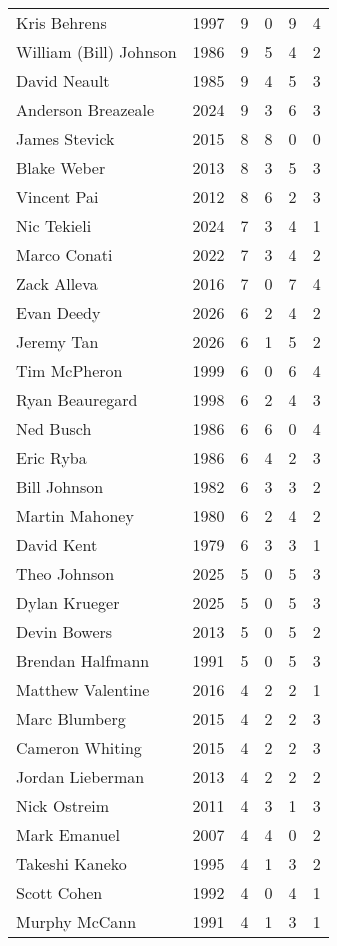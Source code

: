 \begin{longtable}{lccccc}
    Kris Behrens & 1997 & 9 & 0 & 9 & 4 \\
    William (Bill) Johnson & 1986 & 9 & 5 & 4 & 2 \\
    David Neault & 1985 & 9 & 4 & 5 & 3 \\
    Anderson Breazeale & 2024 & 9 & 3 & 6 & 3 \\
    James Stevick & 2015 & 8 & 8 & 0 & 0 \\
    Blake Weber & 2013 & 8 & 3 & 5 & 3 \\
    Vincent Pai & 2012 & 8 & 6 & 2 & 3 \\
    Nic Tekieli & 2024 & 7 & 3 & 4 & 1 \\
    Marco Conati & 2022 & 7 & 3 & 4 & 2 \\
    Zack Alleva & 2016 & 7 & 0 & 7 & 4 \\
    Evan Deedy & 2026 & 6 & 2 & 4 & 2 \\
    Jeremy Tan & 2026 & 6 & 1 & 5 & 2 \\
    Tim McPheron & 1999 & 6 & 0 & 6 & 4 \\
    Ryan Beauregard & 1998 & 6 & 2 & 4 & 3 \\
    Ned Busch & 1986 & 6 & 6 & 0 & 4 \\
    Eric Ryba & 1986 & 6 & 4 & 2 & 3 \\
    Bill Johnson & 1982 & 6 & 3 & 3 & 2 \\
    Martin Mahoney & 1980 & 6 & 2 & 4 & 2 \\
    David Kent & 1979 & 6 & 3 & 3 & 1 \\
    Theo Johnson & 2025 & 5 & 0 & 5 & 3 \\
    Dylan Krueger & 2025 & 5 & 0 & 5 & 3 \\
    Devin Bowers & 2013 & 5 & 0 & 5 & 2 \\
    Brendan Halfmann & 1991 & 5 & 0 & 5 & 3 \\
    Matthew Valentine & 2016 & 4 & 2 & 2 & 1 \\
    Marc Blumberg & 2015 & 4 & 2 & 2 & 3 \\
    Cameron Whiting & 2015 & 4 & 2 & 2 & 3 \\
    Jordan Lieberman & 2013 & 4 & 2 & 2 & 2 \\
    Nick Ostreim & 2011 & 4 & 3 & 1 & 3 \\
    Mark Emanuel & 2007 & 4 & 4 & 0 & 2 \\
    Takeshi Kaneko & 1995 & 4 & 1 & 3 & 2 \\
    Scott Cohen & 1992 & 4 & 0 & 4 & 1 \\
    Murphy McCann & 1991 & 4 & 1 & 3 & 1 \\

\end{longtable}
